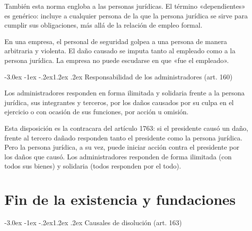\documentclass[12pt,oneside]{book}
\makeatletter
\renewcommand\section{\@startsection{section}{1}{\z@}%
  {-3.0ex \@plus -1ex \@minus -.2ex}{1.2ex \@plus .2ex}%
  {\normalfont\large\bfseries\color{acento}}}
\makeatother
\begin{document}
También esta norma engloba a las personas jurídicas. El término «dependientes» es genérico: incluye a cualquier persona de la que la persona jurídica se sirve para cumplir sus obligaciones, más allá de la relación de empleo formal.

\begin{ejemplo}
En una empresa, el personal de seguridad golpea a una persona de manera arbitraria y violenta. El daño causado se imputa tanto al empleado como a la persona jurídica. La empresa no puede escudarse en que «fue el empleado».
\end{ejemplo}

\section{Responsabilidad de los administradores (art. 160)}

\begin{regla}
Los administradores responden en forma ilimitada y solidaria frente a la persona jurídica, sus integrantes y terceros, por los daños causados por su culpa en el ejercicio o con ocasión de sus funciones, por acción u omisión.
\end{regla}

Esta disposición es la contracara del artículo 1763: si el presidente causó un daño, frente al tercero dañado responden tanto el presidente como la persona jurídica. Pero la persona jurídica, a su vez, puede iniciar acción contra el presidente por los daños que causó. Los administradores responden de forma ilimitada (con todos sus bienes) y solidaria (todos responden por el todo).


\chapter{Fin de la existencia y fundaciones}

\section{Causales de disolución (art. 163)}
\end{document}
